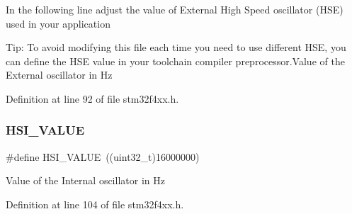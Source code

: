 In the following line adjust the value of External High Speed oscillator (H\+SE) used in your application

Tip\+: To avoid modifying this file each time you need to use different H\+SE, you can define the H\+SE value in your toolchain compiler preprocessor.\+Value of the External oscillator in Hz 

Definition at line 92 of file stm32f4xx.\+h.

\mbox{\label{group___library__configuration__section_gaaa8c76e274d0f6dd2cefb5d0b17fbc37}} 
\subsubsection{\texorpdfstring{H\+S\+I\+\_\+\+V\+A\+L\+UE}{HSI\_VALUE}}
{\footnotesize\ttfamily \#define H\+S\+I\+\_\+\+V\+A\+L\+UE~((uint32\+\_\+t)16000000)}

Value of the Internal oscillator in Hz 

Definition at line 104 of file stm32f4xx.\+h.

